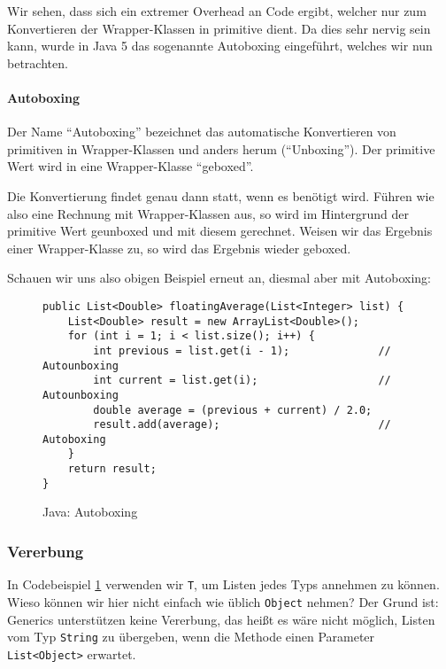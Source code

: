 		Wir sehen, dass sich ein extremer Overhead an Code ergibt, welcher nur zum Konvertieren der Wrapper-Klassen in primitive dient. Da dies sehr nervig sein kann, wurde in Java 5 das sogenannte Autoboxing eingeführt, welches wir nun betrachten.
	
		\paragraph{Autoboxing}
			Der Name \enquote{Autoboxing} bezeichnet das automatische Konvertieren von primitiven in Wrapper-Klassen und anders herum (\enquote{Unboxing}). Der primitive Wert wird in eine Wrapper-Klasse \enquote{geboxed}.
			
			Die Konvertierung findet genau dann statt, wenn es benötigt wird. Führen wie also eine Rechnung mit Wrapper-Klassen aus, so wird im Hintergrund der primitive Wert geunboxed und mit diesem gerechnet. Weisen wir das Ergebnis einer Wrapper-Klasse zu, so wird das Ergebnis wieder geboxed.
			
			
			Schauen wir uns also obigen Beispiel erneut an, diesmal aber mit Autoboxing:
			\begin{figure}[H]
				\centering
				\begin{lstlisting}[style = base]
public List<Double> floatingAverage(List<Integer> list) {
	List<Double> result = new ArrayList<Double>();
	for (int i = 1; i < list.size(); i++) {
		int previous = list.get(i - 1);              // Autounboxing
		int current = list.get(i);                   // Autounboxing
		double average = (previous + current) / 2.0;
		result.add(average);                         // Autoboxing
	}
	return result;
}
				\end{lstlisting}
				\caption{Java: Autoboxing}
				\label{fig:java_generics_motivation_gen}
			\end{figure}
	
	\subsubsection{Vererbung}
		In Codebeispiel \ref{fig:java_generics_motivation_gen} verwenden wir \texttt{T}, um Listen jedes Typs annehmen zu können. Wieso können wir hier nicht einfach wie üblich \texttt{Object} nehmen? Der Grund ist: Generics unterstützen keine Vererbung, das heißt es wäre nicht möglich, Listen vom Typ \texttt{String} zu übergeben, wenn die Methode einen Parameter \texttt{List<Object>} erwartet.
		
